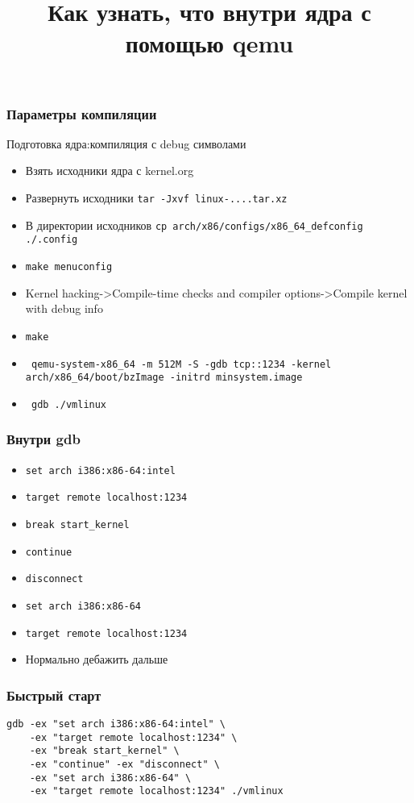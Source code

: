 

\title{Как узнать, что внутри ядра с помощью qemu}


\begin{frame}{}
\titlepage
\end{frame}

\begin{frame}
  \frametitle{Параметры компиляции}
  \begin{center}
    {\large Подготовка ядра:компиляция с debug символами}
  \end{center}
  \begin{itemize}
    \item Взять исходники ядра с kernel.org
    \item Развернуть исходники \texttt{tar -Jxvf linux-....tar.xz}
    \item В директории исходников \texttt{cp arch/x86/configs/x86\_64\_defconfig ./.config}
    \item \texttt{make menuconfig}
    \item Kernel hacking->Compile-time checks and compiler options->Compile kernel with debug info
    \item \texttt{make}
    \item \texttt { qemu-system-x86\_64 -m 512M -S -gdb tcp::1234 -kernel arch/x86\_64/boot/bzImage -initrd minsystem.image}
    \item \texttt{ gdb ./vmlinux}
  \end{itemize}
\end{frame}


\begin{frame}
  \frametitle{Внутри gdb}
  \begin{itemize}
    \item \texttt{set arch i386:x86-64:intel}
    \item \texttt{target remote localhost:1234}
    \item \texttt{break start\_kernel}
    \item \texttt{continue}
    \item \texttt{disconnect}
    \item \texttt{set arch i386:x86-64}
    \item \texttt{target remote localhost:1234}
    \item Нормально дебажить дальше
  \end{itemize}
\end{frame}

\begin{frame}[fragile]
  \frametitle{Быстрый старт}
\begin{lstlisting}
gdb -ex "set arch i386:x86-64:intel" \
    -ex "target remote localhost:1234" \
    -ex "break start_kernel" \
    -ex "continue" -ex "disconnect" \
    -ex "set arch i386:x86-64" \
    -ex "target remote localhost:1234" ./vmlinux
\end{lstlisting}
\end{frame}

